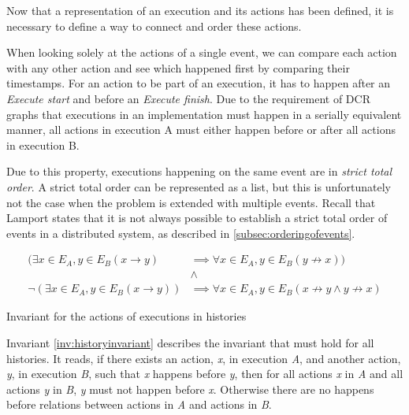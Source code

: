 	\noindent Now that a representation of an execution and its actions has been defined, it is necessary to define a way to connect and order these actions.
    
    \newpar When looking solely at the actions of a single event, we can compare each action with any other action and see which happened first by comparing their timestamps. For an action to be part of an execution, it has to happen after an \textit{Execute start} and before an \textit{Execute finish}. Due to the requirement of DCR graphs that executions in an implementation must happen in a serially equivalent manner, all actions in execution A must either happen before or after all actions in execution B.
    
	\newpar Due to this property, executions happening on the same event are in  \textit{strict total order}. A strict total order can be represented as a list, but this is unfortunately not the case when the problem is extended with multiple events. Recall that Lamport states that it is not always possible to establish a strict total order of events in a distributed system, as described in \autoref{subsec:orderingofevents}.
	
	\begin{invariant}
		\begin{align*}
			(\exists{x\in E_A, y\in E_B}(x\rightarrow y) &\implies \forall{x\in E_A, y\in E_B}(y\not\rightarrow x))\\
			&\land \\
			\lnot(\exists{x\in E_A, y\in E_B}(x \rightarrow y)) &\implies \forall{x\in E_A, y\in E_B}(x\not\rightarrow y\land y\not\rightarrow x)
		\end{align*}
		\caption{Invariant for the actions of executions in histories}
		\label{inv:historyinvariant}
	\end{invariant}
	
	\newpar
	Invariant \ref{inv:historyinvariant} describes the invariant that must hold for all histories. It reads, if there exists an action, \textit{x}, in execution \textit{A}, and another action, \textit{y}, in execution \textit{B}, such that \textit{x} happens before \textit{y}, then for all actions \textit{x} in \textit{A} and all actions \textit{y} in \textit{B}, \textit{y} must not happen before \textit{x}. Otherwise there are no happens before relations between actions in \textit{A} and actions in \textit{B}.
    
